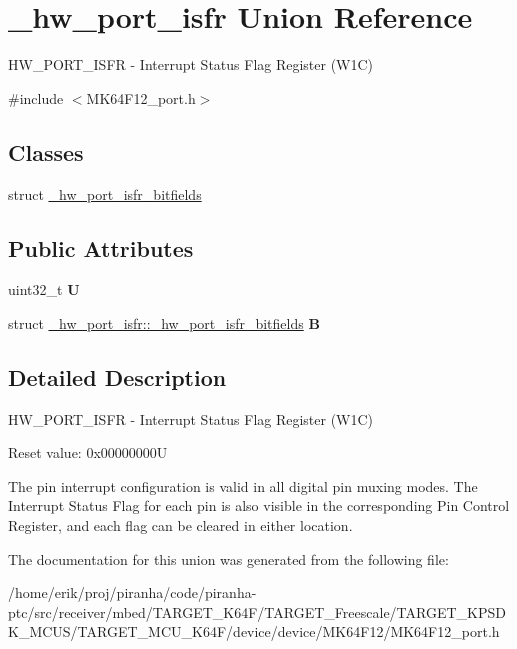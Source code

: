 \hypertarget{union__hw__port__isfr}{}\section{\+\_\+hw\+\_\+port\+\_\+isfr Union Reference}
\label{union__hw__port__isfr}


H\+W\+\_\+\+P\+O\+R\+T\+\_\+\+I\+S\+FR -\/ Interrupt Status Flag Register (W1C)  




{\ttfamily \#include $<$M\+K64\+F12\+\_\+port.\+h$>$}

\subsection*{Classes}
\begin{DoxyCompactItemize}
\item 
struct \hyperlink{struct__hw__port__isfr_1_1__hw__port__isfr__bitfields}{\+\_\+hw\+\_\+port\+\_\+isfr\+\_\+bitfields}
\end{DoxyCompactItemize}
\subsection*{Public Attributes}
\begin{DoxyCompactItemize}
\item 
uint32\+\_\+t {\bfseries U}\hypertarget{union__hw__port__isfr_a069bef84c8fa3ccaceea5714240a2ed5}{}\label{union__hw__port__isfr_a069bef84c8fa3ccaceea5714240a2ed5}

\item 
struct \hyperlink{struct__hw__port__isfr_1_1__hw__port__isfr__bitfields}{\+\_\+hw\+\_\+port\+\_\+isfr\+::\+\_\+hw\+\_\+port\+\_\+isfr\+\_\+bitfields} {\bfseries B}\hypertarget{union__hw__port__isfr_aa415951da7dddec418e809329c2d6ff8}{}\label{union__hw__port__isfr_aa415951da7dddec418e809329c2d6ff8}

\end{DoxyCompactItemize}


\subsection{Detailed Description}
H\+W\+\_\+\+P\+O\+R\+T\+\_\+\+I\+S\+FR -\/ Interrupt Status Flag Register (W1C) 

Reset value\+: 0x00000000U

The pin interrupt configuration is valid in all digital pin muxing modes. The Interrupt Status Flag for each pin is also visible in the corresponding Pin Control Register, and each flag can be cleared in either location. 

The documentation for this union was generated from the following file\+:\begin{DoxyCompactItemize}
\item 
/home/erik/proj/piranha/code/piranha-\/ptc/src/receiver/mbed/\+T\+A\+R\+G\+E\+T\+\_\+\+K64\+F/\+T\+A\+R\+G\+E\+T\+\_\+\+Freescale/\+T\+A\+R\+G\+E\+T\+\_\+\+K\+P\+S\+D\+K\+\_\+\+M\+C\+U\+S/\+T\+A\+R\+G\+E\+T\+\_\+\+M\+C\+U\+\_\+\+K64\+F/device/device/\+M\+K64\+F12/M\+K64\+F12\+\_\+port.\+h\end{DoxyCompactItemize}

